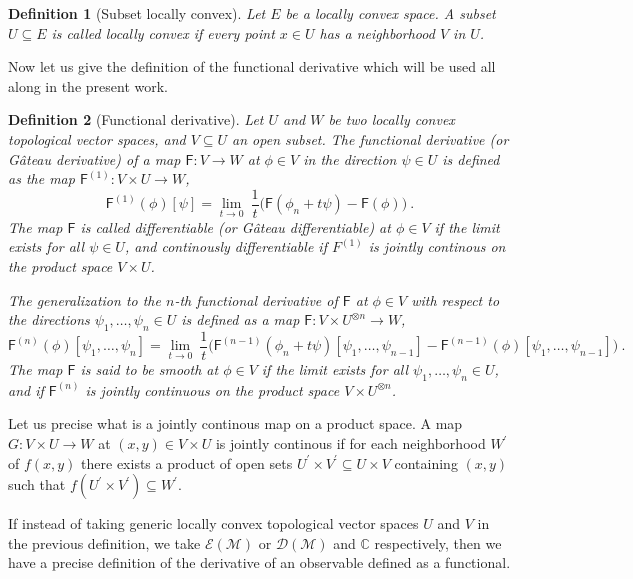 \documentclass[10pt]{book}
\newcommand{\Dcal}{\mathcal{D}}
\newcommand{\Ecal}{\mathcal{E}}
\newcommand{\Mcal}{\mathcal{M}}
\newcommand{\Cbb}{\mathbb{C}}
\newcommand{\Fsf}{\mathsf{F}}
\theoremstyle{break}
\newtheorem{definition}{Definition}
\begin{document}
\begin{definition}[Subset locally convex]
Let $E$ be a locally convex space. A subset $U \subseteq E$ is called locally convex if every point $x \in U$ has a neighborhood $V$ in $U$. 
\end{definition}


Now let us give the definition of the functional derivative which will be used all along in the present work.


\begin{definition}[Functional derivative]
Let $U$ and $W$ be two locally convex topological vector spaces, and $V \subseteq U$ an open subset. The functional derivative (or Gâteau derivative) of a map $\Fsf:  V \to W$ at $\phi \in V$ in the direction $\psi \in U$ is defined as the map $\Fsf^{(1)} : V \times U \to W$,
%
\begin{equation*}
\Fsf^{(1)}(\phi)[\psi] = \lim_{t \to 0} \ \frac{1}{t} \bigg( \Fsf(\phi_n + t \psi) - \Fsf(\phi) \bigg) \ .
\end{equation*}
% 
The map $\Fsf$ is called differentiable (or Gâteau differentiable) at $\phi \in V$ if the limit exists for all $\psi \in U$, and continously differentiable if $F^{(1)}$ is jointly continous on the product space $V \times U$.\par%
%
%
The generalization to the $n$-th functional derivative of $\Fsf$ at $\phi \in V$ with respect to the directions $\psi_1, \dots, \psi_n \in U$ is defined as a map $\Fsf : V \times U^{\otimes n} \to W$,
%
\begin{equation*}%
\Fsf^{(n)}(\phi)[\psi_1,\dots ,\psi_n] = \lim_{t \to 0} \ \frac{1}{t} \bigg( \Fsf^{(n-1)}(\phi_n + t \psi)[\psi_1,\dots ,\psi_{n-1}] - \Fsf^{(n-1)}(\phi)[\psi_1,\dots ,\psi_{n-1}] \bigg) \ .
\end{equation*}
%
The map $\Fsf$ is said to be smooth at $\phi \in V$ if the limit exists for all $\psi_1, \dots, \psi_n \in U$, and if $\Fsf^{(n)}$ is jointly continuous on the product space $V \times U^{\otimes n}$.
\end{definition}


Let us precise what is a jointly continous map on a product space. A map $G : V \times U \to W$ at $(x,y) \in V \times U$ is jointly continous if for each neighborhood $W^\prime$ of $f(x,y)$ there exists a product of open sets $U^\prime \times V^\prime \subseteq U \times V$ containing $(x,y)$ such that $f(U^\prime \times V^\prime) \subseteq W^\prime$.


\bigskip


If instead of taking generic locally convex topological vector spaces $U$ and $V$ in the previous definition, we take $\Ecal(\Mcal)$ or $\Dcal(\Mcal)$ and $\Cbb$ respectively, then we have a precise definition of the derivative of an observable defined as a functional.
\end{document}
